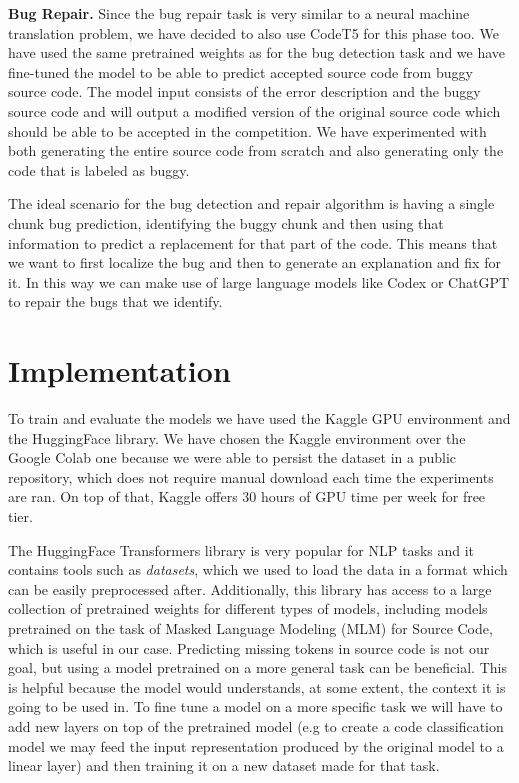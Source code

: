 \documentclass[12pt,a4paper]{report}
\begin{document}
\begin{appendices}
\textbf{Bug Repair.} Since the bug repair task is very similar to a neural machine translation problem, we have decided to also use CodeT5 for this phase too. We have used the same pretrained weights as for the bug detection task and we have fine-tuned the model to be able to predict accepted source code from buggy source code. The model input consists of the error description and the buggy source code and will output a modified version of the original source code which should be able to be accepted in the competition. We have experimented with both generating the entire source code from scratch and also generating only the code that is labeled as buggy.

The ideal scenario for the bug detection and repair algorithm is having a single chunk bug prediction, identifying the buggy chunk and then using that information to predict a replacement for that part of the code. This means that we want to first localize the bug and then to generate an explanation and fix for it. In this way we can make use of large language models like Codex or ChatGPT to repair the bugs that we identify.

\section{Implementation}

To train and evaluate the models we have used the Kaggle GPU environment and the HuggingFace library. We have chosen the Kaggle environment over the Google Colab one because we were able to persist the dataset in a public repository, which does not require manual download each time the experiments are ran. On top of that, Kaggle offers 30 hours of GPU time per week for free tier.

The HuggingFace Transformers library is very popular for NLP tasks and it contains tools such as \textit{datasets}, which we used to load the data in a format which can be easily preprocessed after. Additionally, this library has access to a large collection of pretrained weights for different types of models, including models pretrained on the task of Masked Language Modeling (MLM) for Source Code, which is useful in our case. Predicting missing tokens in source code is not our goal, but using a model pretrained on a more general task can be beneficial. This is helpful because the model would understands, at some extent, the context it is going to be used in. To fine tune a model on a more specific task we will have to add new layers on top of the pretrained model (e.g to create a code classification model we may feed the input representation produced by the original model to a linear layer) and then training it on a new dataset made for that task.


\end{appendices}
\end{document}
